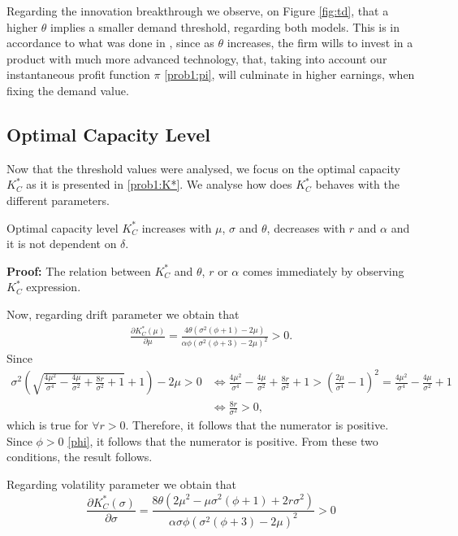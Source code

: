 Regarding the innovation breakthrough we observe, on Figure \ref{fig:td}, that a higher $\theta$ implies a smaller demand threshold, regarding both models. This is in accordance to what was done in \cite{rita}, since as $\theta$ increases, the firm wills to invest in a product with much more advanced technology, that, taking into account our instantaneous profit function $\pi$ \eqref{prob1:pi}, will culminate in higher earnings, when fixing the demand value.



\subsection{Optimal Capacity Level}

Now that the threshold values were analysed, we focus on the optimal capacity $K^*_C$ as it is presented in \eqref{prob1:K*}. We analyse how does $K_C^*$ behaves with the different parameters.

\begin{prop}
	\label{1_prop3}
Optimal capacity level $K^*_C$ increases with $\mu$, $\sigma$ and $\theta$, decreases with $r$ and $\alpha$ and it is not dependent on $\delta$.
\end{prop}


\textbf{Proof:}
The relation between $K^*_C$ and $\theta$, $r$ or $\alpha$ comes immediately by observing $K^*_C$ expression.

Now, regarding drift parameter we obtain that
 \begin{align*}
\frac{\partial K^*_C(\mu)}{\partial \mu}=
\frac{4 \theta \left(\sigma ^2 \left(\phi+1\right)-2 \mu \right)}{\alpha \phi \left(\sigma ^2 \left(\phi+3\right)-2 \mu \right)^2}>0.
\end{align*}
Since
\begin{align}
\label{cond2}
\sigma ^2 \left(\sqrt{\frac{4 \mu ^2}{\sigma ^4}-\frac{4 \mu }{\sigma ^2}+\frac{8 r}{\sigma ^2}+1}+1\right)-2 \mu>0 
& \Leftrightarrow
\frac{4 \mu ^2}{\sigma ^4}-\frac{4 \mu }{\sigma ^2}+\frac{8 r}{\sigma ^2}+1 > \left( \frac{2 \mu}{\sigma^4}-1 \right)^2=\frac{4 \mu ^2}{\sigma ^4}-\frac{4 \mu }{\sigma ^2}+1 \\
& \Leftrightarrow
\frac{8 r}{\sigma ^2}>0, \nonumber
\end{align}
which is true for $\forall r> 0$. Therefore, it follows that the numerator is positive. Since $\phi>0$ \ref{phi}, it follows that the numerator is positive. From these two conditions, the result follows.

Regarding volatility parameter we obtain that
\begin{equation*}
    \frac{\partial K^*_C(\sigma)}{\partial \sigma}= 
\frac{8 \theta \left(2 \mu ^2-\mu  \sigma ^2 \left( \phi+1 \right)+2 r \sigma ^2 \right)}{\alpha \sigma  \phi  \left( \sigma ^2 \left( \phi+3 \right)-2 \mu \right)^2}>0
\end{equation*}

